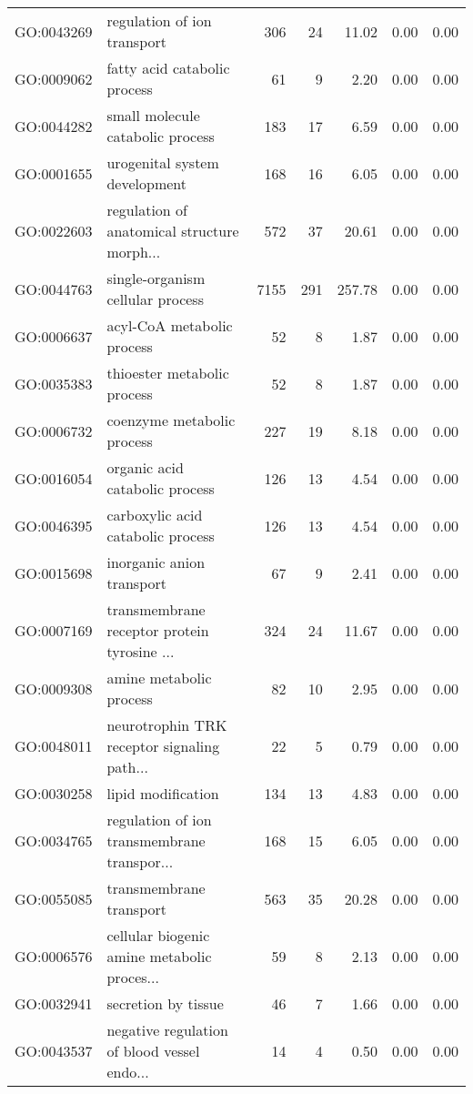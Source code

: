 \begin{table}[ht]
\begin{tabular}{llrrrrr}
  GO:0043269 & regulation of ion transport & 306 &  24 & 11.02 & 0.00 & 0.00 \\ 
  GO:0009062 & fatty acid catabolic process &  61 &   9 & 2.20 & 0.00 & 0.00 \\ 
  GO:0044282 & small molecule catabolic process & 183 &  17 & 6.59 & 0.00 & 0.00 \\ 
  GO:0001655 & urogenital system development & 168 &  16 & 6.05 & 0.00 & 0.00 \\ 
  GO:0022603 & regulation of anatomical structure morph... & 572 &  37 & 20.61 & 0.00 & 0.00 \\ 
  GO:0044763 & single-organism cellular process & 7155 & 291 & 257.78 & 0.00 & 0.00 \\ 
  GO:0006637 & acyl-CoA metabolic process &  52 &   8 & 1.87 & 0.00 & 0.00 \\ 
  GO:0035383 & thioester metabolic process &  52 &   8 & 1.87 & 0.00 & 0.00 \\ 
  GO:0006732 & coenzyme metabolic process & 227 &  19 & 8.18 & 0.00 & 0.00 \\ 
  GO:0016054 & organic acid catabolic process & 126 &  13 & 4.54 & 0.00 & 0.00 \\ 
  GO:0046395 & carboxylic acid catabolic process & 126 &  13 & 4.54 & 0.00 & 0.00 \\ 
  GO:0015698 & inorganic anion transport &  67 &   9 & 2.41 & 0.00 & 0.00 \\ 
  GO:0007169 & transmembrane receptor protein tyrosine ... & 324 &  24 & 11.67 & 0.00 & 0.00 \\ 
  GO:0009308 & amine metabolic process &  82 &  10 & 2.95 & 0.00 & 0.00 \\ 
  GO:0048011 & neurotrophin TRK receptor signaling path... &  22 &   5 & 0.79 & 0.00 & 0.00 \\ 
  GO:0030258 & lipid modification & 134 &  13 & 4.83 & 0.00 & 0.00 \\ 
  GO:0034765 & regulation of ion transmembrane transpor... & 168 &  15 & 6.05 & 0.00 & 0.00 \\ 
  GO:0055085 & transmembrane transport & 563 &  35 & 20.28 & 0.00 & 0.00 \\ 
  GO:0006576 & cellular biogenic amine metabolic proces... &  59 &   8 & 2.13 & 0.00 & 0.00 \\ 
  GO:0032941 & secretion by tissue &  46 &   7 & 1.66 & 0.00 & 0.00 \\ 
  GO:0043537 & negative regulation of blood vessel endo... &  14 &   4 & 0.50 & 0.00 & 0.00 \\ 

\end{tabular}
\end{table}
